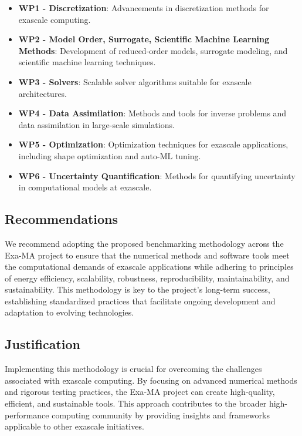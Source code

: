 \begin{itemize}
    \item \textbf{WP1 - Discretization}: Advancements in discretization methods for exascale computing.
    \item \textbf{WP2 - Model Order, Surrogate, Scientific Machine Learning Methods}: Development of reduced-order models, surrogate modeling, and scientific machine learning techniques.
    \item \textbf{WP3 - Solvers}: Scalable solver algorithms suitable for exascale architectures.
    \item \textbf{WP4 - Data Assimilation}: Methods and tools for inverse problems and data assimilation in large-scale simulations.
    \item \textbf{WP5 - Optimization}: Optimization techniques for exascale applications, including shape optimization and auto-ML tuning.
    \item \textbf{WP6 - Uncertainty Quantification}: Methods for quantifying uncertainty in computational models at exascale.
\end{itemize}

\subsection*{Recommendations}

We recommend adopting the proposed benchmarking methodology across the Exa-MA project to ensure that the numerical methods and software tools meet the computational demands of exascale applications while adhering to principles of energy efficiency, scalability, robustness, reproducibility, maintainability, and sustainability. This methodology is key to the project's long-term success, establishing standardized practices that facilitate ongoing development and adaptation to evolving technologies.

\subsection*{Justification}

Implementing this methodology is crucial for overcoming the challenges associated with exascale computing. By focusing on advanced numerical methods and rigorous testing practices, the Exa-MA project can create high-quality, efficient, and sustainable tools. This approach contributes to the broader high-performance computing community by providing insights and frameworks applicable to other exascale initiatives.

